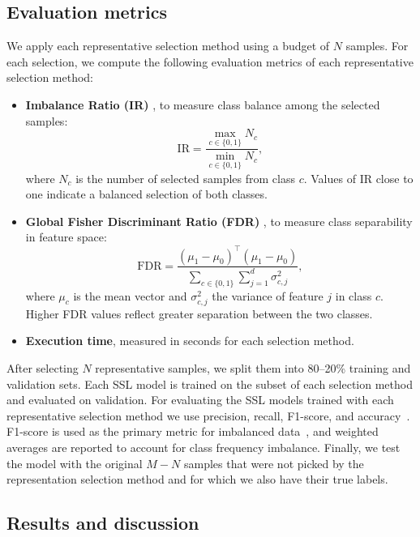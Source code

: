 \documentclass[preprint,12pt]{elsarticle}
\begin{document}
\subsection{Evaluation metrics}

We apply each representative selection method using a budget of \(N\) samples. For each selection, we compute the following evaluation metrics of each representative selection method:

\begin{itemize}
  \item \textbf{Imbalance Ratio (IR)} \cite{he2009learning}, to measure class balance among the selected samples:
  \[
    \mathrm{IR} = \frac{\max_{c\in\{0,1\}} N_c}{\min_{c\in\{0,1\}} N_c},
  \]
  where \(N_c\) is the number of selected samples from class \(c\). Values of IR close to one indicate a balanced selection of both classes.

  \item \textbf{Global Fisher Discriminant Ratio (FDR)} \cite{fisher1936use}, to measure class separability in feature space:
  \[
    \mathrm{FDR} = \frac{(\mu_1 - \mu_0)^\top(\mu_1 - \mu_0)}%
    {\displaystyle\sum_{c\in\{0,1\}}\sum_{j=1}^{d}\sigma_{c,j}^2},
  \]
  where \(\mu_c\) is the mean vector and \(\sigma_{c,j}^2\) the variance of feature \(j\) in class \(c\). Higher FDR values reflect greater separation between the two classes.

  \item \textbf{Execution time}, measured in seconds for each selection method.
\end{itemize}

After selecting \(N\) representative samples, we split them into 80–20\% training and validation sets. Each SSL model is trained on the subset of each selection method and evaluated on validation. For evaluating the SSL models trained with each representative selection method we use precision, recall, F1-score, and accuracy~\cite{lever2016classification}. F1-score is used as the primary metric for imbalanced data~\cite{wardhani2019cross}, and weighted averages are reported to account for class frequency imbalance. Finally, we test the model with the original \(M - N\) samples that were not picked by the representation selection method and for which we also have their true labels.

\subsection{Results and discussion}
\end{document}
